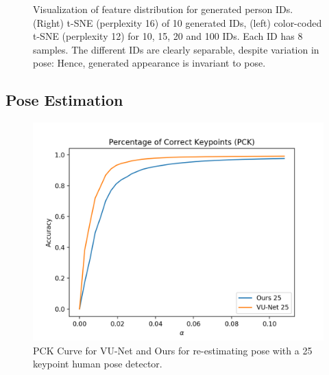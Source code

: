 \begin{figure}[htp]
			\caption{Visualization of feature distribution for generated person IDs. (Right) t-SNE (perplexity 16) of 10 generated IDs, (left) color-coded t-SNE (perplexity 12) for 10, 15, 20 and 100 IDs. Each ID has 8 samples. The different IDs are clearly separable, despite variation in pose: Hence, generated appearance is invariant to pose.}
			\label{fig:tsne}
		\end{figure}

	\subsection{Pose Estimation}
		\begin{figure}[htp]
			\centering
			\includegraphics[trim={0cm 0cm 0cm 0cm},clip, width=0.7\linewidth]{fig/factor/pck25}
			\caption{PCK Curve for VU-Net \cite{esser18} and Ours for re-estimating pose with a 25 keypoint human pose detector.}
			\label{fig:pckcurve}
		\end{figure}

